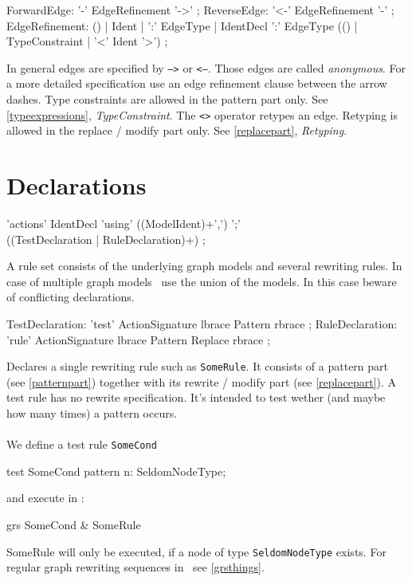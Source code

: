 \begin{rail}
  ForwardEdge: '-' EdgeRefinement '->' ;
  ReverseEdge: '<-' EdgeRefinement '-' ;  
  EdgeRefinement: () | Ident | ':' EdgeType | IdentDecl ':' EdgeType (() | TypeConstraint | '<' Ident '>') ;
\end{rail}
In general edges are specified by \texttt{-->} or \texttt{<--}. Those edges are called \emph{anonymous}. For a more detailed specification use an edge refinement clause between the arrow dashes. Type constraints are allowed in the pattern part only. See \ref{typeexpressions}, \emph{TypeConstraint}. The \texttt{<>} operator retypes an edge. Retyping is allowed in the replace / modify part only. See \ref{replacepart}, \emph{Retyping}.

\section{Declarations}
\label{ruledecls}
\begin{rail}
  'actions' IdentDecl 'using' ((ModelIdent)+',') ';' \\ ((TestDeclaration | RuleDeclaration)+) ;
\end{rail}
A rule set consists of the underlying graph models and several rewriting rules. In case of multiple graph models \GrG\ use the union of the models. In this case beware of conflicting declarations.

\begin{rail}
  TestDeclaration: 'test' ActionSignature lbrace Pattern rbrace ;
  RuleDeclaration: 'rule' ActionSignature lbrace Pattern Replace rbrace ;
\end{rail}
Declares a single rewriting rule such as \texttt{SomeRule}. It consists of a pattern part (see \ref{patternpart}) together with its rewrite / modify part (see \ref{replacepart}). A test rule has no rewrite specification. It's intended to test wether (and maybe how many times) a pattern occurs.\\
{\small \\We define a test rule \texttt{SomeCond}}
\begin{grgen}
test SomeCond {
  pattern {
    n: SeldomNodeType;
  }
}
\end{grgen}
{\small and execute in \GrShell:}
\begin{grshell}
  grs SomeCond & SomeRule
\end{grshell}
{\small SomeRule will only be executed, if a node of type \texttt{SeldomNodeType} exists. For regular graph rewriting sequences in \GrShell\ see \ref{grsthings}.}


